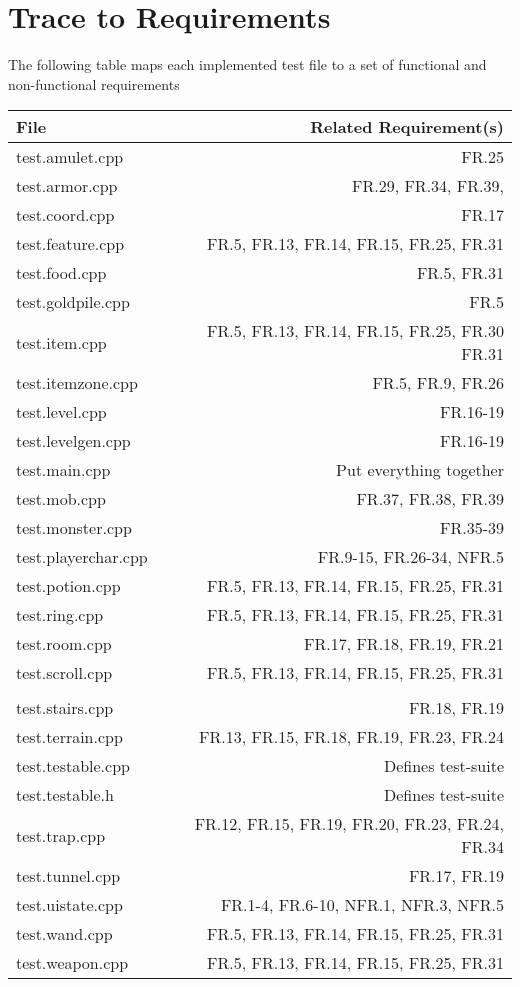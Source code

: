 \documentclass[12pt, titlepage]{article}
\newcommand{\newsection}[1]{
  \newpage
  \section{#1}
}
\begin{document}
\newsection{Trace to Requirements} \label{Section_R_Trace}

	The following table maps each implemented test file to a set of functional and non-functional requirements 

	\begin{table}[h!]
		\caption{\bf Test-Requirement Trace}
		\label{TblMH}
		\bigskip
		\centering
		\begin{longtable}{lr}
			\hline
			File & Related Requirement(s)\\
			\hline
			test.amulet.cpp 		& FR.25\\
			test.armor.cpp 			& FR.29, FR.34, FR.39,\\
			test.coord.cpp 			& FR.17\\
			test.feature.cpp 		& FR.5, FR.13, FR.14, FR.15, FR.25, FR.31\\
			test.food.cpp 			& FR.5, FR.31\\
			test.goldpile.cpp 		& FR.5\\
			test.item.cpp 			& FR.5, FR.13, FR.14, FR.15, FR.25, FR.30 FR.31\\
			test.itemzone.cpp 		& FR.5, FR.9, FR.26\\
			test.level.cpp 			& FR.16-19\\
			test.levelgen.cpp 		& FR.16-19\\
			test.main.cpp 			& Put everything together\\
			test.mob.cpp 			& FR.37, FR.38, FR.39\\
			test.monster.cpp 		& FR.35-39\\
			test.playerchar.cpp 	& FR.9-15, FR.26-34, NFR.5\\
			test.potion.cpp 		& FR.5, FR.13, FR.14, FR.15, FR.25, FR.31\\
			test.ring.cpp 			& FR.5, FR.13, FR.14, FR.15, FR.25, FR.31\\
			test.room.cpp 			& FR.17, FR.18, FR.19, FR.21\\
			test.scroll.cpp 		& FR.5, FR.13, FR.14, FR.15, FR.25, FR.31\\\\
			test.stairs.cpp 		& FR.18, FR.19\\
			test.terrain.cpp 		& FR.13, FR.15, FR.18, FR.19, FR.23, FR.24\\
			test.testable.cpp 		& Defines test-suite\\
			test.testable.h 		& Defines test-suite\\
			test.trap.cpp 			& FR.12, FR.15, FR.19, FR.20, FR.23, FR.24, FR.34\\
			test.tunnel.cpp 		& FR.17, FR.19\\
			test.uistate.cpp 		& FR.1-4, FR.6-10, NFR.1, NFR.3, NFR.5\\
			test.wand.cpp 			& FR.5, FR.13, FR.14, FR.15, FR.25, FR.31\\
			test.weapon.cpp 		& FR.5, FR.13, FR.14, FR.15, FR.25, FR.31\\
			\hline
		\end{longtable}
	\end{table}
\end{document}
